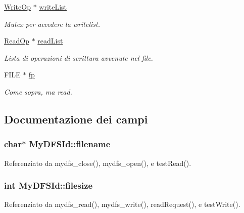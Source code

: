 \begin{DoxyCompactItemize}
\hyperlink{structWriteOp}{Write\+Op} $\ast$ \hyperlink{structMyDFSId_a0f7d2a9c60ddc649ee7e65b8b9295432}{write\+List}
\begin{DoxyCompactList}\small\item\em Mutex per accedere la writelist. \end{DoxyCompactList}\item 
\hyperlink{structReadOp}{Read\+Op} $\ast$ \hyperlink{structMyDFSId_a8a4360512d45c22b6d8e980967c7dd32}{read\+List}
\begin{DoxyCompactList}\small\item\em Lista di operazioni di scrittura avvenute nel file. \end{DoxyCompactList}\item 
F\+I\+L\+E $\ast$ \hyperlink{structMyDFSId_ae2badd91d3b506420a9e49554df8212d}{fp}
\begin{DoxyCompactList}\small\item\em Come sopra, ma read. \end{DoxyCompactList}\end{DoxyCompactItemize}


\subsection{Documentazione dei campi}
\hypertarget{structMyDFSId_ac0e1b8c96d859982c1a7d49f9e929e48}{
\subsubsection[{filename}]{\setlength{\rightskip}{0pt plus 5cm}char$\ast$ My\+D\+F\+S\+Id\+::filename}}\label{structMyDFSId_ac0e1b8c96d859982c1a7d49f9e929e48}


Referenziato da mydfs\+\_\+close(), mydfs\+\_\+open(), e test\+Read().

\hypertarget{structMyDFSId_a2b7cf19c5ac22e03ae8abf7e688fee2a}{
\subsubsection[{filesize}]{\setlength{\rightskip}{0pt plus 5cm}int My\+D\+F\+S\+Id\+::filesize}}\label{structMyDFSId_a2b7cf19c5ac22e03ae8abf7e688fee2a}


Referenziato da mydfs\+\_\+read(), mydfs\+\_\+write(), read\+Request(), e test\+Write().

